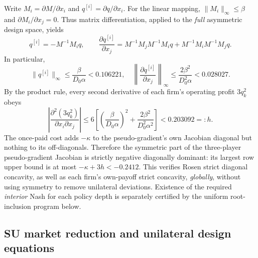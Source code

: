 Write $M_i=\partial M/\partial x_i$ and
$q^{[i]}=\partial q/\partial x_i$.
For the linear mapping,
$\|M_i\|_\infty\leq\beta$ and
$\partial M_i/\partial x_j=0$.
Thus matrix differentiation, applied to the
\emph{full} asymmetric design space, yields
\[
 q^{[i]}=-M^{-1}M_iq,\qquad
 \frac{\partial q^{[i]}}{\partial x_j}
 =M^{-1}M_jM^{-1}M_iq+
  M^{-1}M_iM^{-1}M_jq.
\]
In particular,
\[
 \|q^{[i]}\|_\infty
 \leq\frac{\beta}{D_0\alpha}<0.106221,
 \quad
 \left\|\frac{\partial q^{[i]}}{\partial x_j}
 \right\|_\infty
 \leq\frac{2\beta^2}{D_0^2\alpha}<0.028027.
\]
By the product rule, every second derivative of
each firm's operating profit $3q_k^2$ obeys
\begin{equation}\label{eq:global-design-curvature}
 \left|
 \frac{\partial^2(3q_k^2)}
      {\partial x_i\partial x_j}
 \right|
 \leq 6\left[
 \left(\frac{\beta}{D_0\alpha}\right)^2
 +\frac{2\beta^2}{D_0^2\alpha^2}
 \right]<0.203092=:h.
\end{equation}
The once-paid cost adds $-\kappa$ to the
pseudo-gradient's own Jacobian diagonal but
nothing to its off-diagonals. Therefore the
symmetric part of the three-player pseudo-gradient
Jacobian is strictly negative diagonally dominant:
its largest row upper bound is at most
$-\kappa+3h<-0.2412$.
This verifies Rosen strict diagonal concavity,
as well as each firm's own-payoff strict concavity,
\emph{globally}, without using symmetry to
remove unilateral deviations.
Existence of the required \emph{interior} Nash
for each policy depth is separately certified
by the uniform root-inclusion program below.

\subsection{SU market reduction and unilateral design equations}

